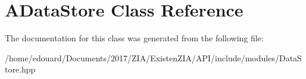 \hypertarget{classADataStore}{}\section{A\+Data\+Store Class Reference}
\label{classADataStore}


The documentation for this class was generated from the following file\+:\begin{DoxyCompactItemize}
\item 
/home/edouard/\+Documents/2017/\+Z\+I\+A/\+Existen\+Z\+I\+A/\+A\+P\+I/include/modules/Data\+Store.\+hpp\end{DoxyCompactItemize}
